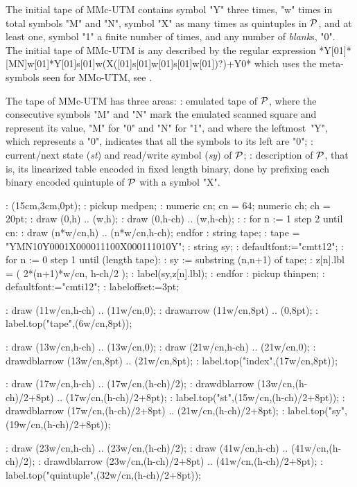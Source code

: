 The initial tape of MMc-UTM contains
 symbol "Y" three times,
 "w" times in total symbols "M" and "N",
 symbol "X" as many times as quintuples in $\cal P$, and at least one,
 symbol "1" a finite number of times,
 and any number of {\em blank}s, "0".
The initial tape of MMc-UTM is any described by the regular expression
*Y[01]*[MN]{w}[01]*Y[01]{s}[01]{w}(X([01]{s}[01]{w}[01]{s}[01]{w}[01])?)+Y0*
\endcode
which uses the meta-symbols seen for MMo-UTM, see .

The tape of MMc-UTM has three areas:
\beginpoints
{}: emulated tape of $\cal P$,
 where the consecutive symbols "M" and "N" mark
 the emulated scanned square and represent its value,
 "M" for "0" and "N" for "1",
 and where the leftmost~"Y", which represents a "0",
 indicates that all the symbols to its left are "0";
: current/next state ({\em st}) and
 read/write symbol ({\em sy}) of $\cal P$;
: description of $\cal P$,
 that is, its linearized table encoded in fixed length binary,
 done by prefixing each binary encoded quintuple of $\cal P$
 with a symbol "X".
\endpoints

\MT:
\MTbeginfig(15cm,3cm,0pt);
\MT: pickup medpen;
\MT: numeric cn; cn = 64; numeric ch; ch = 20pt;
\MT: draw (0,h) .. (w,h);
\MT: draw (0,h-ch) .. (w,h-ch);
\MT:
\MT: for n := 1 step 2 until cn:
\MT:  draw (n*w/cn,h) .. (n*w/cn,h-ch); endfor
\MT: string tape;
\MT: tape = "YMN10Y0001X000011100X000111010Y";
\MT: string sy;
\MT: defaultfont:="cmtt12";
\MT: for n := 0 step 1 until (length tape):
\MT:  sy := substring (n,n+1) of tape;
\MT:  z[n].lbl = ( 2*(n+1)*w/cn, h-ch/2 );
\MT:  label(sy,z[n].lbl);
\MT: endfor
\MT: pickup thinpen;
\MT: defaultfont:="cmti12";
\MT: labeloffset:=3pt;

\MT: draw (11w/cn,h-ch) .. (11w/cn,0);
\MT: drawarrow  (11w/cn,8pt) .. (0,8pt);
\MT: label.top("tape",(6w/cn,8pt));

\MT: draw (13w/cn,h-ch) .. (13w/cn,0);
\MT: draw (21w/cn,h-ch) .. (21w/cn,0);
\MT: drawdblarrow  (13w/cn,8pt) .. (21w/cn,8pt);
\MT: label.top("index",(17w/cn,8pt));

\MT: draw (17w/cn,h-ch) .. (17w/cn,(h-ch)/2);
\MT: drawdblarrow  (13w/cn,(h-ch)/2+8pt) .. (17w/cn,(h-ch)/2+8pt);
\MT: label.top("st",(15w/cn,(h-ch)/2+8pt));
\MT: drawdblarrow  (17w/cn,(h-ch)/2+8pt) .. (21w/cn,(h-ch)/2+8pt);
\MT: label.top("sy",(19w/cn,(h-ch)/2+8pt));

\MT: draw (23w/cn,h-ch) .. (23w/cn,(h-ch)/2);
\MT: draw (41w/cn,h-ch) .. (41w/cn,(h-ch)/2);
\MT: drawdblarrow  (23w/cn,(h-ch)/2+8pt) .. (41w/cn,(h-ch)/2+8pt);
\MT: label.top("quintuple",(32w/cn,(h-ch)/2+8pt));

